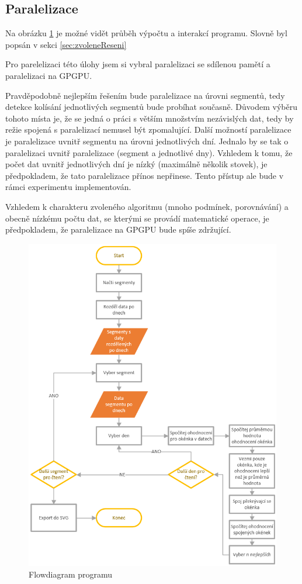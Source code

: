 \documentclass{article}
\begin{document}
	\subsection{Paralelizace}
	 Na obrázku \ref{fig:flowdiagram} je možné vidět průběh výpočtu a interakcí programu. Slovně byl popsán v sekci \ref{sec:zvoleneReseni}
	 
	Pro parelelizaci této úlohy jsem si vybral paralelizaci se sdílenou pamětí a paralelizaci na GPGPU.
	
	Pravděpodobně nejlepším řešením bude paralelizace na úrovni segmentů, tedy detekce kolísání jednotlivých segmentů bude probíhat současně. Důvodem výběru tohoto místa je, že se jedná o práci s větším množstvím nezávislých dat, tedy by režie spojená s paralelizací nemusel být zpomalující.
	Další možností paralelizace je paralelizace uvnitř segmentu na úrovni jednotlivých dní. Jednalo by se tak o paralelizaci uvnitř paralelizace (segment a jednotlivé dny). Vzhledem k tomu, že počet dat uvnitř jednotlivých dní je nízký (maximálně několik stovek), je předpokladem, že tato paralelizace přínos nepřinese. Tento přístup ale bude v rámci experimentu implementován.
	
	Vzhledem k charakteru zvoleného algoritmu (mnoho podmínek, porovnávání) a obecně nízkému počtu dat, se kterými se provádí matematické operace, je předpokladem, že paralelizace na GPGPU bude spíše zdržující.
	
	
	\begin{figure}
		\centering
		\includegraphics[width=0.7\linewidth]{flowDiagram}
		\caption[Flowdiagram programu]{Flowdiagram programu}
		\label{fig:flowdiagram}
	\end{figure}
	\newpage
\end{document}
